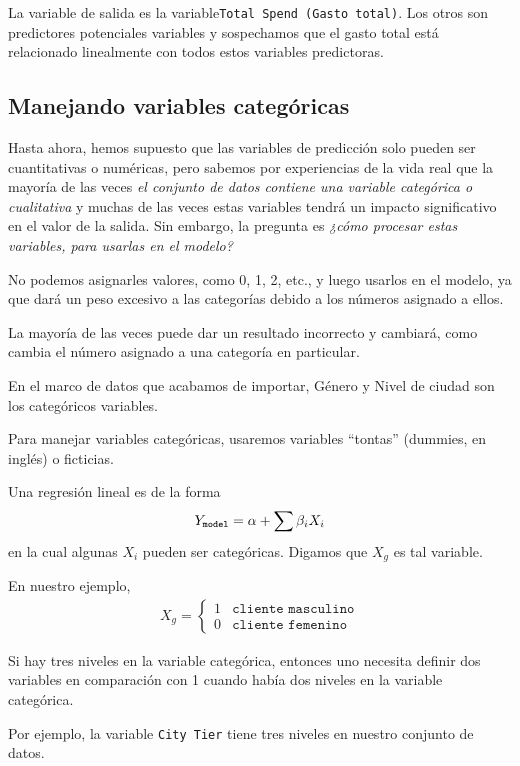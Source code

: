 La variable de salida es la variable\texttt{Total Spend (Gasto total)}. Los otros son predictores potenciales
variables y sospechamos que el gasto total está relacionado linealmente con todos estos
variables predictoras.


\subsection{Manejando variables categóricas}

Hasta ahora, hemos supuesto que las variables de predicción solo pueden ser cuantitativas o
numéricas, pero sabemos por experiencias de la vida real que la mayoría de las veces \emph{el conjunto de datos
contiene una variable categórica o cualitativa} y muchas de las veces estas variables
tendrá un impacto significativo en el valor de la salida. Sin embargo, la pregunta es
\emph{¿cómo procesar estas variables, para usarlas en el modelo?}


No podemos asignarles valores, como 0, 1, 2, etc., y luego usarlos en el
modelo, ya que dará un peso excesivo a las categorías debido a los números
asignado a ellos. 

La mayoría de las veces puede dar un resultado incorrecto y cambiará,
como cambia el número asignado a una categoría en particular.


En el marco de datos que acabamos de importar, Género y Nivel de ciudad son los categóricos
variables.


Para manejar variables categóricas, usaremos variables ``tontas'' (dummies, en inglés) o ficticias.


Una regresión lineal es de la forma
\begin{align}
 Y_{\texttt{model}}=\alpha + \sum \beta_{i}X_{i}
\end{align}
en la cual algunas $X_{i}$ pueden ser categóricas. Digamos que $X_{g}$ es tal variable.


En nuestro ejemplo,
\begin{align}X_{g}=
 \begin{cases}
  1 & \texttt{cliente masculino} \\
  0 & \texttt{cliente femenino}
 \end{cases}
\end{align}


Si hay tres niveles en la variable categórica, entonces uno necesita definir dos
variables en comparación con 1 cuando había dos niveles en la variable categórica.

Por ejemplo, la variable \texttt{City Tier} tiene tres niveles en nuestro conjunto de datos.


